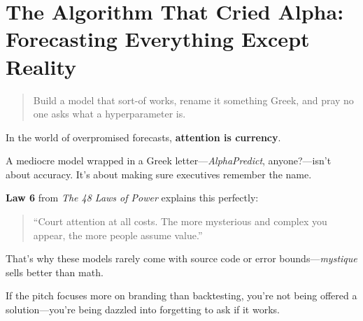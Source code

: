 \section{The Algorithm That Cried Alpha: Forecasting Everything Except Reality}


\begin{quote}
Build a model that sort-of works, rename it something Greek, and pray no one asks what a hyperparameter is.
\end{quote}


  In the world of overpromised forecasts, \textbf{attention is currency}.
  
  \medskip
  
  A mediocre model wrapped in a Greek letter—\textit{AlphaPredict\texttrademark}, anyone?—isn’t about accuracy. It’s about making sure executives remember the name.
  
  \medskip
  
  \textbf{Law 6} from \textit{The 48 Laws of Power} explains this perfectly:
  \begin{quote}
  ``Court attention at all costs. The more mysterious and complex you appear, the more people assume value.''
  \end{quote}
  
  \medskip
  
  That’s why these models rarely come with source code or error bounds—\textit{mystique} sells better than math.
  
  \medskip
  
  If the pitch focuses more on branding than backtesting, you're not being offered a solution—you’re being dazzled into forgetting to ask if it works.
  
  



